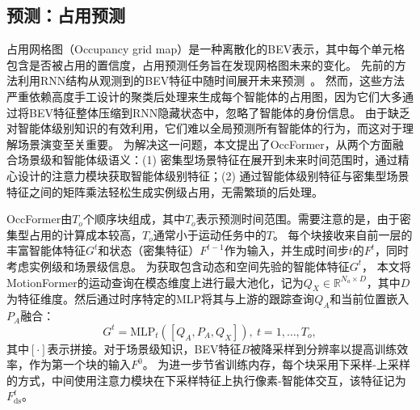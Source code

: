 \documentclass[10pt,twocolumn,letterpaper]{article}
\begin{document}
\subsection{预测：占用预测}
\label{sec:occ-method}
\vspace{-4pt}

占用网格图（Occupancy grid map）是一种离散化的BEV表示，其中每个单元格包含是否被占用的置信度，占用预测任务旨在发现网格图未来的变化。
%
先前的方法利用RNN结构从观测到的BEV特征中随时间展开未来预测~\cite{hu2021fiery, hu2022stp3, zhang2022beverse}。
%
然而，这些方法严重依赖高度手工设计的聚类后处理来生成每个智能体的占用图，因为它们大多通过将BEV特征整体压缩到RNN隐藏状态中，忽略了智能体的身份信息。
%
由于缺乏对智能体级别知识的有效利用，它们难以全局预测所有智能体的行为，而这对于理解场景演变至关重要。
%
为解决这一问题，本文提出了OccFormer，从两个方面融合场景级和智能体级语义：(1) 密集型场景特征在展开到未来时间范围时，通过精心设计的注意力模块获取智能体级别特征；(2) 通过智能体级别特征与密集型场景特征之间的矩阵乘法轻松生成实例级占用，无需繁琐的后处理。

OccFormer由$T_o$个顺序块组成，其中$T_o$表示预测时间范围。需要注意的是，由于密集型占用的计算成本较高，$T_o$通常小于运动任务中的$T$。
%
每个块接收来自前一层的丰富智能体特征$G^t$和状态（密集特征）$F^{t-1}$作为输入，并生成时间步$t$的$F^t$，同时考虑实例级和场景级信息。
%
为获取包含动态和空间先验的智能体特征$G^t$，
本文将MotionFormer的运动查询在模态维度上进行最大池化，记为$Q_X\!\in\!\mathbb{R}^{N_a\!\times\!D}$，其中$D$为特征维度。然后通过时序特定的MLP将其与上游的跟踪查询$Q_{A}$和当前位置嵌入$P_{A}$融合：
%
\begin{equation}
\label{eq:query fuse}
    G^t = \text{MLP}_{t}([Q_{A}, P_{A}, Q_{X}]),\ t={1,\dots,T_o},
\end{equation}
%
其中$[\cdot]$表示拼接。对于场景级知识，BEV特征$B$被降采样到分辨率以提高训练效率，作为第一个块的输入$F^0$。
%
为进一步节省训练内存，每个块采用下采样-上采样的方式，中间使用注意力模块在下采样特征上执行像素-智能体交互，该特征记为$F_{\text{ds}}^t$。

\vspace{-7pt}
\end{document}
